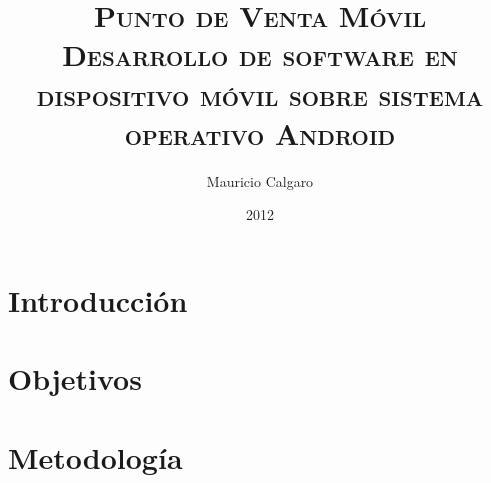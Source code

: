 \documentclass{ubpthesisb}
\author{Mauricio Calgaro}
\title{
	\textsc{\textbf{
		Punto de Venta M\'ovil\\
		\LARGE{Desarrollo de software en dispositivo m\'ovil sobre sistema operativo Android}
	}}
}
\date{2012}
\begin{document}


\renewcommand{\tablename}{Tabla}
\renewcommand{\listtablename}{\'Indice de tablas}

\maketitle

\frontmatter

\begin{acknowledgements}
	
\end{acknowledgements}

\begin{dedicate}
	
\end{dedicate}

\begin{resumen}
		
\end{resumen}

\tableofcontents
\listoffigures
\listoftables


\mainmatter

\acresetall
\part{Introducci\'on}


\part{Objetivos}


\part{Metodolog\'ia}




%
\end{document}
